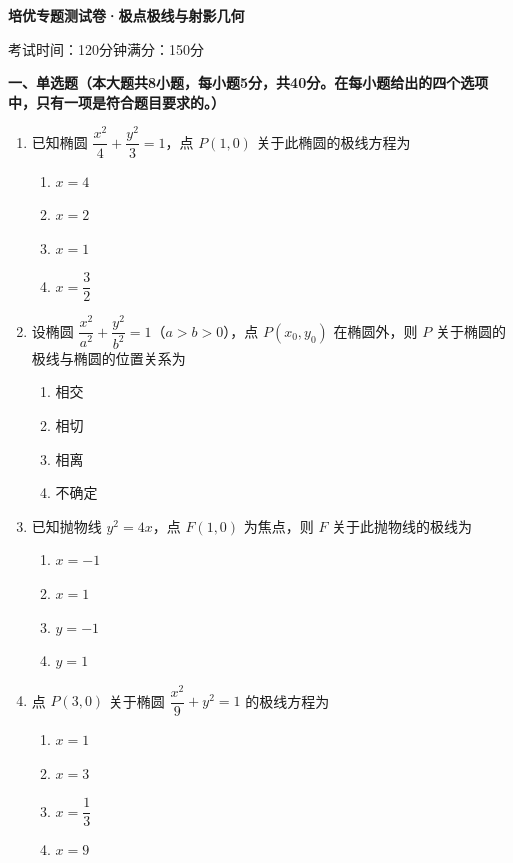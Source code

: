 \documentclass[12pt, a4paper]{ctexart}
\newcommand{\score}[1]{\hfill\makebox[2cm][l]{(#1分)}}
\begin{document}
\begin{center}
\Large\textbf{培优专题测试卷·极点极线与射影几何}

\normalsize
考试时间：120分钟\quad 满分：150分
\end{center}

\vspace{0.5cm}

\noindent\textbf{一、单选题（本大题共8小题，每小题5分，共40分。在每小题给出的四个选项中，只有一项是符合题目要求的。）}

\vspace{0.3cm}

\begin{enumerate}
\item 已知椭圆 $\dfrac{x^2}{4} + \dfrac{y^2}{3} = 1$，点 $P(1, 0)$ 关于此椭圆的极线方程为\score{5}
\begin{enumerate}[label=\Alph*.]
\item $x = 4$
\item $x = 2$
\item $x = 1$
\item $x = \dfrac{3}{2}$
\end{enumerate}

\item 设椭圆 $\dfrac{x^2}{a^2} + \dfrac{y^2}{b^2} = 1$（$a > b > 0$），点 $P(x_0, y_0)$ 在椭圆外，则 $P$ 关于椭圆的极线与椭圆的位置关系为\score{5}
\begin{enumerate}[label=\Alph*.]
\item 相交
\item 相切
\item 相离
\item 不确定
\end{enumerate}

\item 已知抛物线 $y^2 = 4x$，点 $F(1, 0)$ 为焦点，则 $F$ 关于此抛物线的极线为\score{5}
\begin{enumerate}[label=\Alph*.]
\item $x = -1$
\item $x = 1$
\item $y = -1$
\item $y = 1$
\end{enumerate}

\item 点 $P(3, 0)$ 关于椭圆 $\dfrac{x^2}{9} + y^2 = 1$ 的极线方程为\score{5}
\begin{enumerate}[label=\Alph*.]
\item $x = 1$
\item $x = 3$
\item $x = \dfrac{1}{3}$
\item $x = 9$
\end{enumerate}


\end{enumerate}
\end{document}
